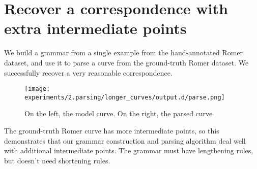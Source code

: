 
\FloatBarrier

\section{Recover a correspondence with extra intermediate points}

We build a grammar from a single example from the hand-annotated Romer
dataset, and use it to parse a curve from the ground-truth Romer
dataset. We successfully recover a very reasonable correspondence.

\begin{figure}
\texttt{[image: experiments/2.parsing/longer\_curves/output.d/parse.png]}
\caption{On the left, the model curve. On the right, the parsed curve}
\end{figure}

The ground-truth Romer curve has more intermediate points, so this
demonstrates that our grammar construction and parsing algorithm deal
well with additional intermediate points. The grammar must have
lengthening rules, but doesn't need shortening rules.

